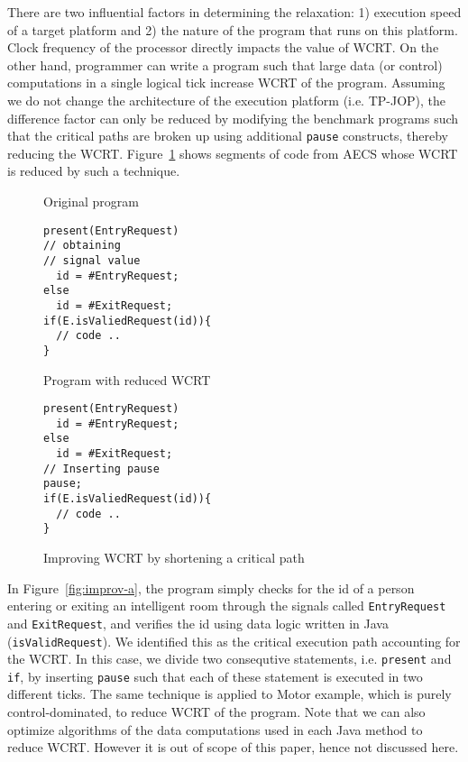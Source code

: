 There are two influential factors in determining the relaxation: 1)
execution speed of a target platform and 2) the nature of the program
that runs on this platform. Clock frequency of the processor directly
impacts the value of WCRT. On the other hand, programmer can write a
program such that large data (or control) computations in a single
logical tick increase WCRT of the program.  Assuming we do not change
the architecture of the execution platform (i.e. TP-JOP), the difference
factor can only be reduced by modifying the benchmark programs such that
the critical paths are broken up using additional \texttt{pause}
constructs, thereby reducing the WCRT.  Figure~\ref{fig:improv} shows
segments of code from AECS whose WCRT is reduced by such a technique.

\begin{figure}[h!]
	\centering
	\vspace{-10pt}
	\begin{SubFloat}{\label{fig:improv-a}Original program}
    \begin{minipage}[b]{0.45\linewidth}
		\begin{lstlisting}[style=sysj,morekeywords={present,emit,trap,pause,exit,delay,suspend}]
present(EntryRequest)
// obtaining 
// signal value
  id = #EntryRequest;
else
  id = #ExitRequest;
if(E.isValiedRequest(id)){
  // code ..
}
\end{lstlisting}
\end{minipage}
\end{SubFloat}
  \begin{SubFloat}{\label{fig:improv-b}Program with reduced WCRT}
    \centering
    \begin{minipage}[b]{0.45\linewidth}
		\begin{lstlisting}[style=sysj,morekeywords={emit,present,trap,pause,exit,delay,suspend}]
present(EntryRequest)
  id = #EntryRequest;
else
  id = #ExitRequest;
// Inserting pause
pause; 
if(E.isValiedRequest(id)){
  // code ..
}
\end{lstlisting}
		\end{minipage}
	\end{SubFloat}
	\caption{Improving WCRT by shortening a critical path}
	\label{fig:improv}
	\vspace{-10pt}
\end{figure}

In Figure~\ref{fig:improv-a}, the program simply checks for the id of a
person entering or exiting an intelligent room through the signals
called \texttt{EntryRequest} and \texttt{Exit\-Request}, and verifies
the id using data logic written in Java (\texttt{isValidRequest}). We
identified this as the critical execution path accounting for the WCRT.
In this case, we divide two consequtive statements, i.e.
\texttt{present} and \texttt{if}, by inserting \texttt{pause} such that
each of these statement is executed in two different ticks. The same
technique is applied to Motor example, which is purely
control-dominated, to reduce WCRT of the program. Note that we can also
optimize algorithms of the data computations used in each Java method to
reduce WCRT. However it is out of scope of this paper, hence not
discussed here.

